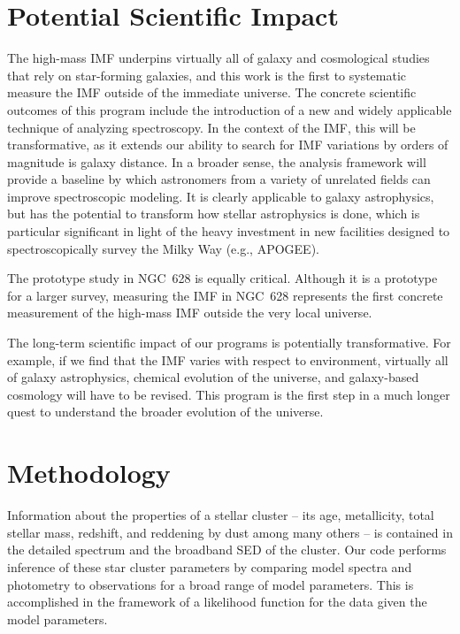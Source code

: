 \documentclass[11pt,preprint]{aastex}
\begin{document}
\section{Potential Scientific Impact}

The high-mass IMF underpins virtually all of galaxy and cosmological studies that rely on star-forming galaxies, and this work is the first to systematic measure the IMF outside of the immediate universe.  The concrete scientific outcomes of this program include the introduction of a new and widely applicable technique of analyzing spectroscopy.  In the context of the IMF, this will be transformative, as it extends our ability to search for IMF variations by orders of magnitude is galaxy distance.  In a broader sense, the analysis framework will provide a baseline by which astronomers from a variety of unrelated fields can improve spectroscopic modeling.  It is clearly applicable to galaxy astrophysics, but has the potential to transform how stellar astrophysics is done, which is particular significant in light of the heavy investment in new facilities designed to spectroscopically survey the Milky Way (e.g., APOGEE).

The prototype study in NGC~628 is equally critical.  Although it is a prototype for a larger survey, measuring the IMF in NGC~628 represents the first concrete measurement of the high-mass IMF outside the very local universe.  

The long-term scientific impact of our programs is potentially transformative.  For example, if we find that the IMF varies with respect to environment, virtually all of galaxy astrophysics, chemical evolution of the universe, and galaxy-based cosmology will have to be revised.  This program is the first step in a much longer quest to understand the broader evolution of the universe.

\section{Methodology}

Information about the properties of a stellar cluster -- its age, metallicity, total stellar mass, redshift, and reddening by dust among many others -- is contained in the detailed spectrum and the broadband SED of the cluster. 
Our code performs inference of these star cluster parameters by comparing model spectra and photometry to observations for a broad range of model parameters.  
This is accomplished in the framework of a likelihood function for the data given the model parameters.  
\end{document}
